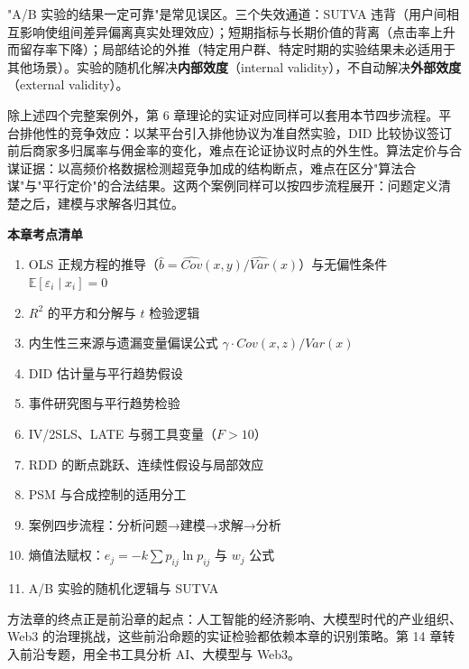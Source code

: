 \begin{misconception}
"A/B 实验的结果一定可靠"是常见误区。三个失效通道：SUTVA 违背（用户间相互影响使组间差异偏离真实处理效应）；短期指标与长期价值的背离（点击率上升而留存率下降）；局部结论的外推（特定用户群、特定时期的实验结果未必适用于其他场景）。实验的随机化解决\textbf{内部效度}（internal validity），不自动解决\textbf{外部效度}（external validity）。
\end{misconception}

除上述四个完整案例外，第 6 章理论的实证对应同样可以套用本节四步流程。平台排他性的竞争效应：以某平台引入排他协议为准自然实验，DID 比较协议签订前后商家多归属率与佣金率的变化，难点在论证协议时点的外生性。算法定价与合谋证据：以高频价格数据检测超竞争加成的结构断点，难点在区分"算法合谋"与"平行定价"的合法结果。这两个案例同样可以按四步流程展开：问题定义清楚之后，建模与求解各归其位。

\begin{chapterbox}
\textbf{本章考点清单}

\begin{enumerate}
\item OLS 正规方程的推导（$\hat b = \widehat{Cov}(x,y)/\widehat{Var}(x)$）与无偏性条件 $\mathbb{E}[\varepsilon_i \mid x_i] = 0$ 
\item $R^2$ 的平方和分解与 $t$ 检验逻辑 
\item 内生性三来源与遗漏变量偏误公式 $\gamma \cdot Cov(x,z)/Var(x)$ 
\item DID 估计量与平行趋势假设 
\item 事件研究图与平行趋势检验 
\item IV/2SLS、LATE 与弱工具变量（$F > 10$）
\item RDD 的断点跳跃、连续性假设与局部效应 
\item PSM 与合成控制的适用分工 
\item 案例四步流程：分析问题→建模→求解→分析 
\item 熵值法赋权：$e_j = -k\sum p_{ij}\ln p_{ij}$ 与 $w_j$ 公式 
\item A/B 实验的随机化逻辑与 SUTVA 
\end{enumerate}
\end{chapterbox}

方法章的终点正是前沿章的起点：人工智能的经济影响、大模型时代的产业组织、Web3 的治理挑战，这些前沿命题的实证检验都依赖本章的识别策略。第 14 章转入前沿专题，用全书工具分析 AI、大模型与 Web3。
